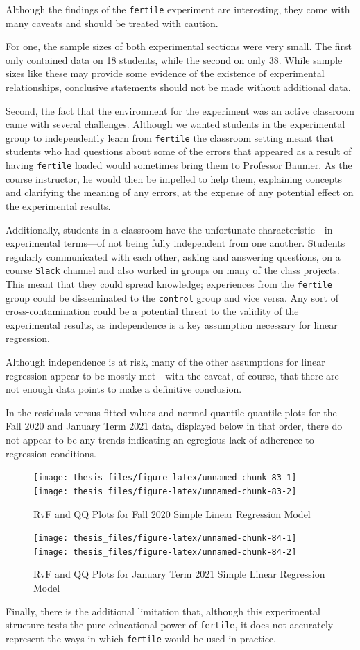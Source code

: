 \documentclass[12pt,twoside]{reedthesis}
\begin{document}
Although the findings of the \texttt{fertile} experiment are interesting, they come with many caveats and should be treated with caution.

For one, the sample sizes of both experimental sections were very small. The first only contained data on 18 students, while the second on only 38. While sample sizes like these may provide some evidence of the existence of experimental relationships, conclusive statements should not be made without additional data.

Second, the fact that the environment for the experiment was an active classroom came with several challenges. Although we wanted students in the experimental group to independently learn from \texttt{fertile} the classroom setting meant that students who had questions about some of the errors that appeared as a result of having \texttt{fertile} loaded would sometimes bring them to Professor Baumer. As the course instructor, he would then be impelled to help them, explaining concepts and clarifying the meaning of any errors, at the expense of any potential effect on the experimental results.

Additionally, students in a classroom have the unfortunate characteristic---in experimental terms---of not being fully independent from one another. Students regularly communicated with each other, asking and answering questions, on a course \texttt{Slack} channel and also worked in groups on many of the class projects. This meant that they could spread knowledge; experiences from the \texttt{fertile} group could be disseminated to the \texttt{control} group and vice versa. Any sort of cross-contamination could be a potential threat to the validity of the experimental results, as independence is a key assumption necessary for linear regression.

Although independence is at risk, many of the other assumptions for linear regression appear to be mostly met---with the caveat, of course, that there are not enough data points to make a definitive conclusion.

In the residuals versus fitted values and normal quantile-quantile plots for the Fall 2020 and January Term 2021 data, displayed below in that order, there do not appear to be any trends indicating an egregious lack of adherence to regression conditions.
\begin{figure}
\texttt{[image: thesis\_files/figure-latex/unnamed-chunk-83-1]} \texttt{[image: thesis\_files/figure-latex/unnamed-chunk-83-2]} \caption{RvF and QQ Plots for Fall 2020 Simple Linear Regression Model}\label{fig:unnamed-chunk-83}
\end{figure}
\begin{figure}
\texttt{[image: thesis\_files/figure-latex/unnamed-chunk-84-1]} \texttt{[image: thesis\_files/figure-latex/unnamed-chunk-84-2]} \caption{RvF and QQ Plots for January Term 2021 Simple Linear Regression Model}\label{fig:unnamed-chunk-84}
\end{figure}
Finally, there is the additional limitation that, although this experimental structure tests the pure educational power of \texttt{fertile}, it does not accurately represent the ways in which \texttt{fertile} would be used in practice.
\end{document}
